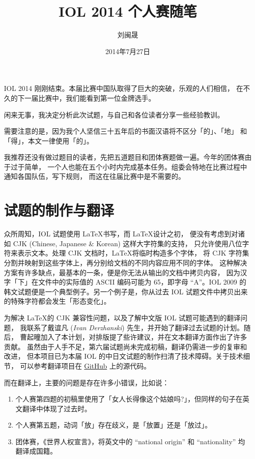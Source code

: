 \documentclass[11pt]{article}
\title{IOL 2014 个人赛随笔}
\date{2014年7月27日}
\author{刘闽晟}
\newcommand \sq [1]{「#1」}
\newcommand \bookref [1]{《#1》}
\newcommand \westname [1]{\textit{#1}}
\begin{document}


\maketitle

IOL 2014 刚刚结束。本届比赛中国队取得了巨大的突破，乐观的人们相信，
在不久的下一届比赛中，我们能看到第一位金牌选手。

闲来无事，我决定分析此次试题，与自己和各位读者分享一些经验教训。

需要注意的是，因为我个人坚信三十五年后的书面汉语将不区分\sq{的}、\sq{地}
和\sq{得}，本文一律使用\sq{的}。

我推荐还没有做过题目的读者，先把五道题目和团体赛题做一遍。今年的团体赛由于过于简单，
一个人也能在五个小时内完成基本任务。组委会特地在比赛过程中通知各国队伍，写下规则，
而这在往届比赛中是不需要的。

\section{试题的制作与翻译}

众所周知，IOL 试题使用 \LaTeX 书写\cite{IOLEdit}，而 \LaTeX 设计之初，
便没有考虑到对诸如 CJK (Chinese, Japanese \& Korean) 这样大字符集的支持，
只允许使用八位字符来表示文本。处理 CJK 文档时，\LaTeX 将临时构造多个字体，
将 CJK 字符集分割并映射到这些字体上，再分别给文档的不同内容应用不同的字体。
这种解决方案有许多缺点，最基本的一条，便是你无法从输出的文档中拷贝内容，
因为汉字\sq{下}在文件中的实际值的 ASCII 编码可能为 65，即字母 “A”。IOL 2009
的韩文试题便是一个典型例子。另一个例子是，你从过去 IOL 试题文件中拷贝出来的特殊字符都会发生\sq{形态变化}。

为解决 \LaTeX 的 CJK 兼容性问题，以及了解中文版 IOL 试题可能遇到的翻译问题，
我联系了戴谊凡 (\westname{Ivan Derzhanski}) 先生，并开始了翻译过去试题的计划。随后，
曹起曈加入了本计划，对排版提了些许建议，并在文本翻译方面作出了许多贡献。
虽然由于人手不足，第六届试题尚未完成初稿，翻译仍需进一步的复审和改进，
但本项目已为本届 IOL 的中日文试题的制作扫清了技术障碍。关于技术细节，
可以参考翻译项目在 \href{https://github.com/notcome/IOL.cn}{GitHub} 上的源代码。

而在翻译上，主要的问题是存在许多小错误，比如说：

\begin{enumerate}
\item 个人赛第四题的初稿里使用了\sq{女人长得像这个姑娘吗?}，但同样的句子在英文翻译中体现了过去时。

\item 个人赛第五题，动词\sq{放}存在歧义，是\sq{放置}还是\sq{放过}。

\item 团体赛，\bookref{世界人权宣言}，将英文中的 “national origin” 和 “nationality” 均翻译成国籍。
\end{enumerate}
\end{document}
